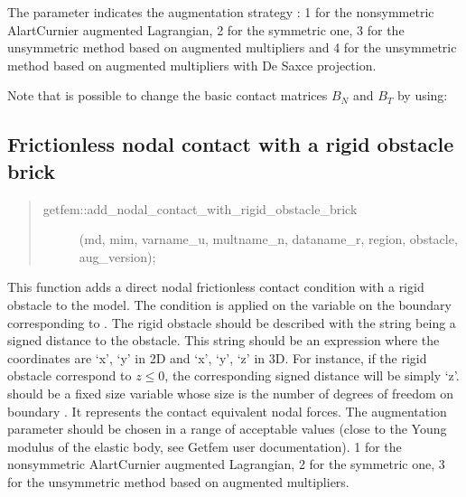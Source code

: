\documentclass[a4paper,11pt,english]{sphinxmanual}
\begin{document}
The parameter  indicates the augmentation strategy :
1 for the non\sphinxhyphen{}symmetric Alart\sphinxhyphen{}Curnier augmented Lagrangian,
2 for the symmetric one,
3 for the unsymmetric method based on augmented multipliers and
4 for the unsymmetric method based on augmented multipliers with De Saxce projection.

Note that is possible to change the basic contact matrices \(B_N\) and \(B_T\) by using:

\begin{sphinxVerbatim}[commandchars=\\\{\}]
 
 
\end{sphinxVerbatim}


\subsection{Frictionless nodal contact with a rigid obstacle brick}
\label{\detokenize{userdoc/model_contact_friction:frictionless-nodal-contact-with-a-rigid-obstacle-brick}}\begin{quote}
\begin{description}
\item[{getfem::add\_nodal\_contact\_with\_rigid\_obstacle\_brick}] \leavevmode
(md, mim, varname\_u, multname\_n, dataname\_r, region, obstacle, aug\_version);

\end{description}
\end{quote}

This function adds a direct nodal frictionless contact condition with a rigid obstacle to the model. The condition is applied on the variable 
on the boundary corresponding to . The rigid obstacle should
be described with the string  being a signed distance to
the obstacle. This string should be an expression where the coordinates
are ‘x’, ‘y’ in 2D and ‘x’, ‘y’, ‘z’ in 3D. For instance, if the rigid
obstacle correspond to \(z \le 0\), the corresponding signed distance will
be simply ‘z’.  should be a fixed size variable whose size is
the number of degrees of freedom on boundary . It represents the
contact equivalent nodal forces.
The augmentation parameter  should be chosen in a
range of acceptable values (close to the Young modulus of the elastic
body, see Getfem user documentation). 1 for the non\sphinxhyphen{}symmetric Alart\sphinxhyphen{}Curnier augmented Lagrangian, 2 for the symmetric one, 3 for the unsymmetric method based on augmented multipliers.
\end{document}
